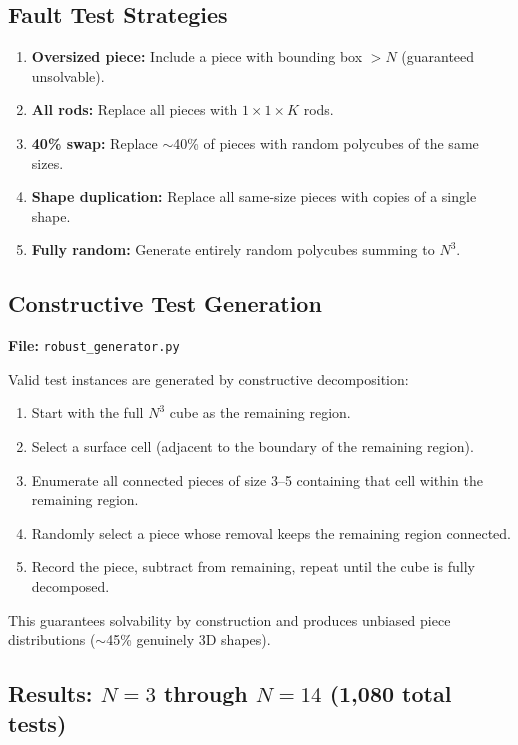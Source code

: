 \documentclass[11pt]{article}
\begin{document}
\subsection{Fault Test Strategies}

\begin{enumerate}[nosep]
  \item \textbf{Oversized piece:} Include a piece with bounding box $> N$ (guaranteed unsolvable).
  \item \textbf{All rods:} Replace all pieces with $1 \times 1 \times K$ rods.
  \item \textbf{40\% swap:} Replace $\sim$40\% of pieces with random polycubes of the same sizes.
  \item \textbf{Shape duplication:} Replace all same-size pieces with copies of a single shape.
  \item \textbf{Fully random:} Generate entirely random polycubes summing to $N^3$.
\end{enumerate}

\subsection{Constructive Test Generation}

\textbf{File:} \texttt{robust\_generator.py}

Valid test instances are generated by constructive decomposition:
\begin{enumerate}[nosep]
  \item Start with the full $N^3$ cube as the remaining region.
  \item Select a surface cell (adjacent to the boundary of the remaining region).
  \item Enumerate all connected pieces of size 3--5 containing that cell within the remaining region.
  \item Randomly select a piece whose removal keeps the remaining region connected.
  \item Record the piece, subtract from remaining, repeat until the cube is fully decomposed.
\end{enumerate}

This guarantees solvability by construction and produces unbiased piece distributions ($\sim$45\% genuinely 3D shapes).

\subsection{Results: $N=3$ through $N=14$ (1,080 total tests)}
\end{document}
